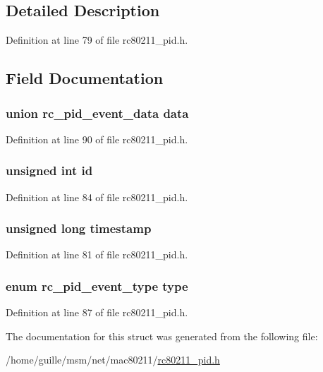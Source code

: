 \subsection{Detailed Description}


Definition at line 79 of file rc80211\-\_\-pid.\-h.



\subsection{Field Documentation}
\hypertarget{structrc__pid__event_ad7906c836bd8f9691c05d7b1754e059c}{
\subsubsection[{data}]{\setlength{\rightskip}{0pt plus 5cm}union {\bf rc\-\_\-pid\-\_\-event\-\_\-data} data}}\label{structrc__pid__event_ad7906c836bd8f9691c05d7b1754e059c}


Definition at line 90 of file rc80211\-\_\-pid.\-h.

\hypertarget{structrc__pid__event_ab7ce6f462afaf105224b0ca772a33c43}{
\subsubsection[{id}]{\setlength{\rightskip}{0pt plus 5cm}unsigned int id}}\label{structrc__pid__event_ab7ce6f462afaf105224b0ca772a33c43}


Definition at line 84 of file rc80211\-\_\-pid.\-h.

\hypertarget{structrc__pid__event_acba7776dcc1861edfe0e9c5736de4df8}{
\subsubsection[{timestamp}]{\setlength{\rightskip}{0pt plus 5cm}unsigned long timestamp}}\label{structrc__pid__event_acba7776dcc1861edfe0e9c5736de4df8}


Definition at line 81 of file rc80211\-\_\-pid.\-h.

\hypertarget{structrc__pid__event_ad5d1f941fce20a7c87ff35faaf354710}{
\subsubsection[{type}]{\setlength{\rightskip}{0pt plus 5cm}enum {\bf rc\-\_\-pid\-\_\-event\-\_\-type} type}}\label{structrc__pid__event_ad5d1f941fce20a7c87ff35faaf354710}


Definition at line 87 of file rc80211\-\_\-pid.\-h.



The documentation for this struct was generated from the following file\-:\begin{DoxyCompactItemize}
\item 
/home/guille/msm/net/mac80211/\hyperlink{rc80211__pid_8h}{rc80211\-\_\-pid.\-h}\end{DoxyCompactItemize}
